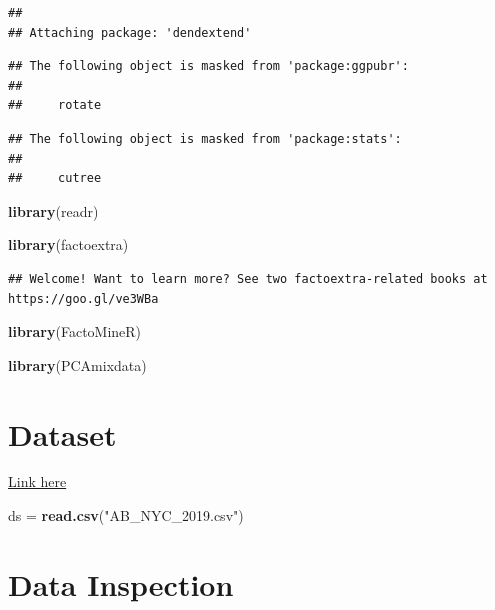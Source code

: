 \documentclass[
]{article}
\newenvironment{Shaded}{\begin{snugshade}}{\end{snugshade}}
\newcommand{\KeywordTok}[1]{\textcolor[rgb]{0.13,0.29,0.53}{\textbf{#1}}}
\newcommand{\NormalTok}[1]{#1}
\newcommand{\StringTok}[1]{\textcolor[rgb]{0.31,0.60,0.02}{#1}}
\begin{document}
\begin{verbatim}
## 
## Attaching package: 'dendextend'
\end{verbatim}

\begin{verbatim}
## The following object is masked from 'package:ggpubr':
## 
##     rotate
\end{verbatim}

\begin{verbatim}
## The following object is masked from 'package:stats':
## 
##     cutree
\end{verbatim}

\begin{Shaded}
\begin{Highlighting}[]
\KeywordTok{library}\NormalTok{(readr)}

\KeywordTok{library}\NormalTok{(factoextra)}
\end{Highlighting}
\end{Shaded}

\begin{verbatim}
## Welcome! Want to learn more? See two factoextra-related books at https://goo.gl/ve3WBa
\end{verbatim}

\begin{Shaded}
\begin{Highlighting}[]
\KeywordTok{library}\NormalTok{(FactoMineR)}


\KeywordTok{library}\NormalTok{(PCAmixdata)}
\end{Highlighting}
\end{Shaded}

\hypertarget{dataset}{%
\section{Dataset}\label{dataset}}

\href{https://www.kaggle.com/dgomonov/new-york-city-airbnb-open-data}{Link
here}

\begin{Shaded}
\begin{Highlighting}[]
\NormalTok{ds =}\StringTok{ }\KeywordTok{read.csv}\NormalTok{(}\StringTok{"AB_NYC_2019.csv"}\NormalTok{)}
\end{Highlighting}
\end{Shaded}

\hypertarget{data-inspection}{%
\section{Data Inspection}\label{data-inspection}}
\end{document}
